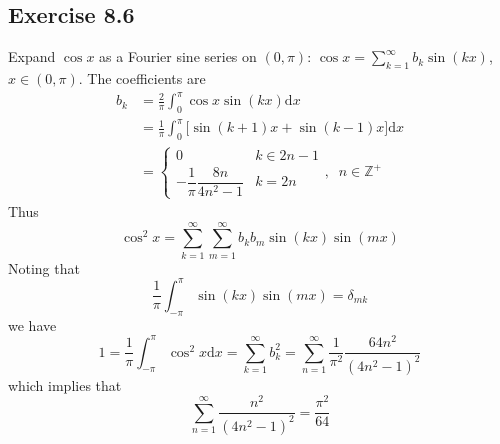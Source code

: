 \documentclass[]{ctexart}
\begin{document}
\subsection{Exercise 8.6}
Expand $\cos x$ as a Fourier sine series on $(0,\pi)$: $\cos x=\sum_{k=1}^\infty b_k\sin(kx)$, $x\in(0,\pi)$. The coefficients are 
\begin{align*}
b_k&=\frac{2}{\pi}\int_0^\pi\cos x\sin(kx)\mathrm{d}x\\
&=\frac{1}{\pi}\int_0^\pi\big[\sin(k+1)x+\sin(k-1)x\big]\mathrm{d}x\\
&=\begin{cases}
0 & k\in 2n-1\\
-\dfrac{1}{\pi}\dfrac{8n}{4n^2-1} & k=2n
\end{cases},\;\;n\in\mathbb Z^+
\end{align*}
Thus 
\begin{equation*}
\cos^2 x=\sum_{k=1}^\infty\sum_{m=1}^\infty b_k b_m\sin(kx)\sin(mx)
\end{equation*}
Noting that 
\begin{equation*}
\frac{1}{\pi}\int_{-\pi}^\pi\sin(kx)\sin(mx)=\delta_{mk}
\end{equation*}
we have 
\begin{equation*}
1=\frac{1}{\pi}\int_{-\pi}^\pi\cos^2 x\mathrm{d}x=\sum_{k=1}^\infty b_k^2=\sum_{n=1}^\infty\frac{1}{\pi^2}\frac{64 n^2}{(4n^2-1)^2}
\end{equation*}
which implies that 
\begin{equation*}
\sum_{n=1}^\infty\frac{n^2}{(4n^2-1)^2}=\frac{\pi^2}{64}
\end{equation*}
\end{document}
